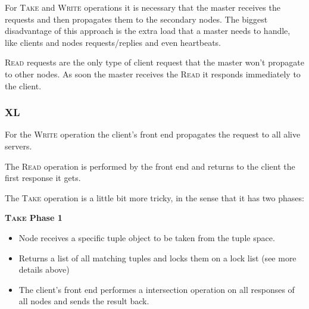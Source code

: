 \documentclass[times, 10pt,twocolumn]{article}
\begin{document}
For \textsc{Take} and \textsc{Write} operations it is necessary that the master receives the requests
and then propagates them to the secondary nodes. The biggest disadvantage of this approach is the extra
load that a master needs to handle, like clients and nodes requests/replies and even heartbeats.


\textsc{Read} requests are the only type of client request that the master won't propagate to other nodes.
As soon the master receives the \textsc{Read} it responds immediately to the client.


\subsubsection{XL}


For the \textsc{Write} operation the client's front end propagates the request to all alive servers.

The \textsc{Read} operation is performed by the front end and returns to the client the first response it gets.

The \textsc{Take} operation is a little bit more tricky, in the sense that it has two phases:

\textbf{\textsc{Take} Phase 1}
\begin{itemize}
   \item Node receives a specific tuple object to be taken from the tuple space.
   \item Returns a list of all matching tuples and locks them on a lock list (see more details above)
   \item The client's front end performes a intersection operation on all responses of all nodes and sends the result
   back.
\end{itemize}
\end{document}
